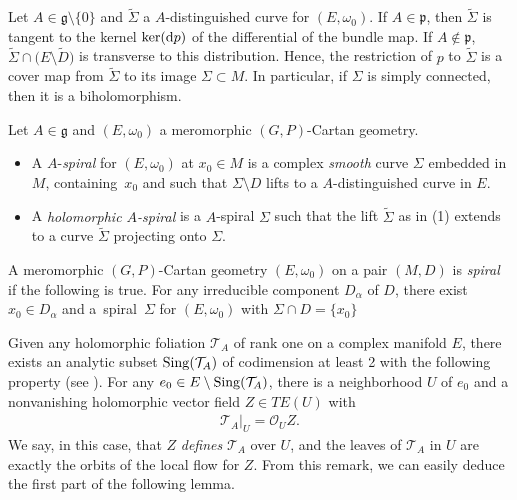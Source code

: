 \documentclass[10pt,a4paper]{amsart}
\numberwithin{equation}{section}
\begin{document}
Let $A\in \mathfrak{g}\setminus \{0\}$ and $\tilde{\Sigma}$ a $A$-distinguished curve for $(E,\omega_0)$. If $A\in \mathfrak{p}$, then $\tilde{\Sigma}$ is tangent to the kernel $\ker({\rm d}p)$ of the differential of the bundle map. If $A\not \in \mathfrak{p}$, $\tilde{\Sigma}\cap \big(E\setminus \tilde{D}\big)$ is transverse to this distribution. Hence, the restriction of $p$ to $\tilde{\Sigma}$ is a cover map from $\tilde{\Sigma}$ to its image $\Sigma\subset M$. In particular, if $\Sigma$ is simply connected, then it is a biholomorphism.

 \begin{Definition}\label{spiral} Let $A\in \mathfrak{g}$ and $(E,\omega_0)$ a meromorphic $(G,P)$-Cartan geometry.
 \begin{itemize}\itemsep=0pt
 \item[(1)] A $A$-\textit{spiral} for $(E,\omega_0)$ at $x_0 \in M$ is a complex \textit{smooth} curve $\Sigma$ embedded in $M$, containing~$x_0$ and such that $\Sigma \setminus D$ lifts to a $A$-distinguished curve in $E$.

 \item[(2)] A \textit{holomorphic $A$-spiral} is a $A$-spiral $\Sigma$ such that the lift $\tilde{\Sigma}$ as in (1) extends to a curve $\tilde{\Sigma}$ projecting onto $\Sigma$. \end{itemize}
 \end{Definition}

\begin{Definition}\label{taucondition} A meromorphic $(G,P)$-Cartan geometry $(E,\omega_0)$ on a pair $(M,D)$ is \textit{spiral} if the following is true. For any irreducible component $D_\alpha$ of $D$, there exist $x_0\in D_\alpha$ and a~spiral~$\Sigma$ for $(E,\omega_0)$ with $\Sigma \cap D = \{x_0\}$
\end{Definition}

Given any holomorphic foliation $\mathcal{T}_A$ of rank one on a complex manifold $E$, there exists an analytic subset ${\rm Sing}(\mathcal{T}_A)$ of codimension at least 2 with the following property (see \cite[p.~11]{Brunella}). For any $e_0 \in E\setminus {\rm Sing}(\mathcal{T}_A)$, there is a neighborhood $U$ of $e_0$ and a nonvanishing holomorphic vector field $Z \in TE(U)$ with
\begin{gather*}%
 \mathcal{T}_A\vert_U = \mathcal{O}_U Z.
\end{gather*}
 We say, in this case, that $Z$ \textit{defines} $\mathcal{T}_A$ over $U$, and the leaves of $\mathcal{T}_A$ in $U$ are exactly the orbits of the local flow for $Z$. From this remark, we can easily deduce the first part of the following lemma.
\end{document}
